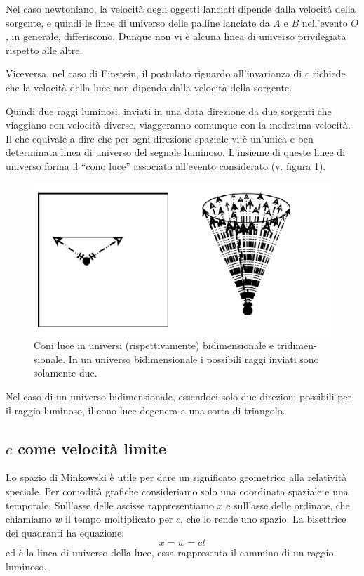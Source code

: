 Nel caso newtoniano, la velocità degli oggetti lanciati dipende dalla velocità della sorgente, 
e quindi le linee di universo delle palline lanciate da $A$ e $B$ nell'evento $O$, in generale, differiscono. Dunque non vi 
è alcuna linea di universo privilegiata rispetto alle altre.

Viceversa, nel caso di Einstein, il postulato riguardo all'invarianza di $c$
richiede che la velocità della luce non dipenda dalla velocità della sorgente.

Quindi due raggi luminosi, inviati in una data direzione da due sorgenti
che viaggiano con velocità diverse, viaggeranno comunque con la medesima
velocità. Il che equivale a dire che per ogni direzione spaziale vi è un'unica e
ben determinata linea di universo del segnale luminoso. 
L'insieme di queste linee di universo forma il ``cono luce'' associato all'evento considerato (v. figura
\ref{coni_luce}). 

\begin{figure}[htbp]
   \centering
   \includegraphics[scale=1]{immagini/minkowski/coni_luce}
   \caption{\label{coni_luce}Coni luce in universi (rispettivamente) bidimensionale e tridimen-
sionale. In un universo bidimensionale i possibili raggi inviati sono solamente due.}
\end{figure}

Nel caso di un universo bidimensionale, essendoci solo due direzioni
possibili per il raggio luminoso, il cono luce degenera a una sorta di triangolo.

\subsection{$c$ come velocità limite}

Lo spazio di Minkowski è utile per dare un significato geometrico alla relatività speciale.
Per comodità grafiche consideriamo solo una coordinata spaziale e una temporale. Sull'asse delle ascisse rappresentiamo $x$ 
e sull'asse delle ordinate, che chiamiamo $w$ il tempo moltiplicato per $c$, che lo rende uno spazio.
La bisettrice dei quadranti ha equazione:
\begin{equation}
 x = w = ct
\end{equation}
ed è la linea di universo della luce, essa rappresenta il cammino di un raggio luminoso.

